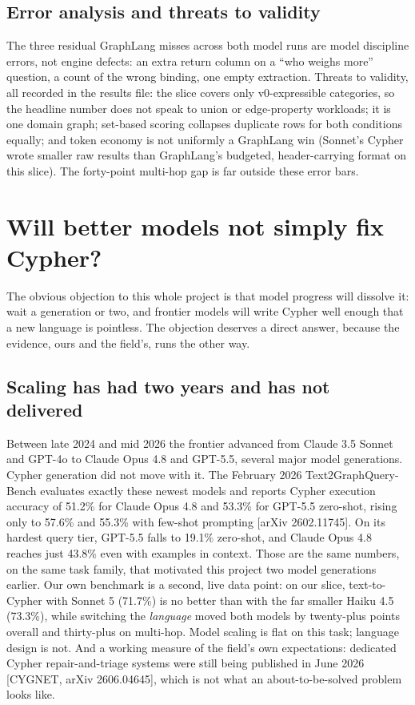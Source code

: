 \documentclass[11pt]{article}
\begin{document}
\subsection{Error analysis and threats to validity}

The three residual GraphLang misses across both model runs are model discipline errors, not engine defects: an extra return column on a ``who weighs more'' question, a count of the wrong binding, one empty extraction. Threats to validity, all recorded in the results file: the slice covers only v0-expressible categories, so the headline number does not speak to union or edge-property workloads; it is one domain graph; set-based scoring collapses duplicate rows for both conditions equally; and token economy is not uniformly a GraphLang win (Sonnet's Cypher wrote smaller raw results than GraphLang's budgeted, header-carrying format on this slice). The forty-point multi-hop gap is far outside these error bars.

\section{Will better models not simply fix Cypher?}\label{sec:scaling}

The obvious objection to this whole project is that model progress will dissolve it: wait a generation or two, and frontier models will write Cypher well enough that a new language is pointless. The objection deserves a direct answer, because the evidence, ours and the field's, runs the other way.

\subsection{Scaling has had two years and has not delivered}

Between late 2024 and mid 2026 the frontier advanced from Claude 3.5 Sonnet and GPT-4o to Claude Opus 4.8 and GPT-5.5, several major model generations. Cypher generation did not move with it. The February 2026 Text2GraphQuery-Bench evaluates exactly these newest models and reports Cypher execution accuracy of 51.2\% for Claude Opus 4.8 and 53.3\% for GPT-5.5 zero-shot, rising only to 57.6\% and 55.3\% with few-shot prompting [arXiv 2602.11745]. On its hardest query tier, GPT-5.5 falls to 19.1\% zero-shot, and Claude Opus 4.8 reaches just 43.8\% even with examples in context. Those are the same numbers, on the same task family, that motivated this project two model generations earlier. Our own benchmark is a second, live data point: on our slice, text-to-Cypher with Sonnet 5 (71.7\%) is no better than with the far smaller Haiku 4.5 (73.3\%), while switching the \emph{language} moved both models by twenty-plus points overall and thirty-plus on multi-hop. Model scaling is flat on this task; language design is not. And a working measure of the field's own expectations: dedicated Cypher repair-and-triage systems were still being published in June 2026 [CYGNET, arXiv 2606.04645], which is not what an about-to-be-solved problem looks like.
\end{document}
